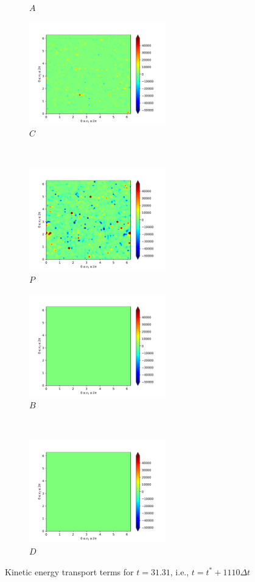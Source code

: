 \begin{figure}[H]
\begin{subfigure}{0.45\textwidth}
        \caption{$A$}
    \end{subfigure}
    \newline
    \begin{subfigure}{0.45\textwidth}
        \includegraphics[height=1.75in]{media/run-cds-65-25k/C-ke-449}
        \caption{$C$}
    \end{subfigure}
    ~
    \begin{subfigure}{0.45\textwidth}
        \includegraphics[height=1.75in]{media/run-cds-65-25k/P-ke-449}
        \caption{$P$}
    \end{subfigure}
    \newline
    \begin{subfigure}{0.45\textwidth}
        \includegraphics[height=1.75in]{media/run-cds-65-25k/B-ke-449}
        \caption{$B$}
    \end{subfigure}
    ~
    \begin{subfigure}{0.45\textwidth}
        \includegraphics[height=1.75in]{media/run-cds-65-25k/D-ke-449}
        \caption{$D$}
    \end{subfigure}
    \caption{Kinetic energy transport terms for $t=31.31$, i.e., $t=t^{\ast} + 1110 \Delta t$}
\end{figure}
